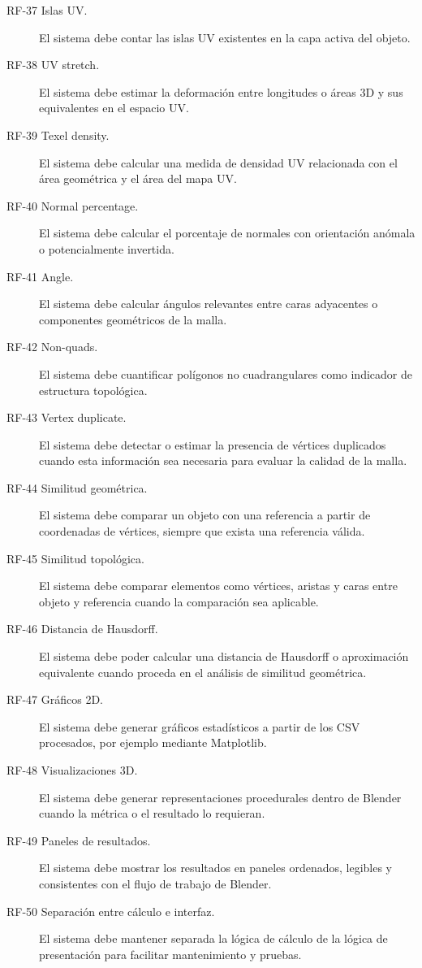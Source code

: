 \begin{description}
    \item[RF-37 Islas UV.] El sistema debe contar las islas UV existentes en la capa activa del objeto.

    \item[RF-38 UV stretch.] El sistema debe estimar la deformación entre longitudes o áreas 3D y sus equivalentes en el espacio UV.

    \item[RF-39 Texel density.] El sistema debe calcular una medida de densidad UV relacionada con el área geométrica y el área del mapa UV.

    \item[RF-40 Normal percentage.] El sistema debe calcular el porcentaje de normales con orientación anómala o potencialmente invertida.

    \item[RF-41 Angle.] El sistema debe calcular ángulos relevantes entre caras adyacentes o componentes geométricos de la malla.

    \item[RF-42 Non-quads.] El sistema debe cuantificar polígonos no cuadrangulares como indicador de estructura topológica.

    \item[RF-43 Vertex duplicate.] El sistema debe detectar o estimar la presencia de vértices duplicados cuando esta información sea necesaria para evaluar la calidad de la malla.

    \item[RF-44 Similitud geométrica.] El sistema debe comparar un objeto con una referencia a partir de coordenadas de vértices, siempre que exista una referencia válida.

    \item[RF-45 Similitud topológica.] El sistema debe comparar elementos como vértices, aristas y caras entre objeto y referencia cuando la comparación sea aplicable.

    \item[RF-46 Distancia de Hausdorff.] El sistema debe poder calcular una distancia de Hausdorff o aproximación equivalente cuando proceda en el análisis de similitud geométrica.

    \item[RF-47 Gráficos 2D.] El sistema debe generar gráficos estadísticos a partir de los CSV procesados, por ejemplo mediante Matplotlib.

    \item[RF-48 Visualizaciones 3D.] El sistema debe generar representaciones procedurales dentro de Blender cuando la métrica o el resultado lo requieran.

    \item[RF-49 Paneles de resultados.] El sistema debe mostrar los resultados en paneles ordenados, legibles y consistentes con el flujo de trabajo de Blender.

    \item[RF-50 Separación entre cálculo e interfaz.] El sistema debe mantener separada la lógica de cálculo de la lógica de presentación para facilitar mantenimiento y pruebas.
\end{description}

